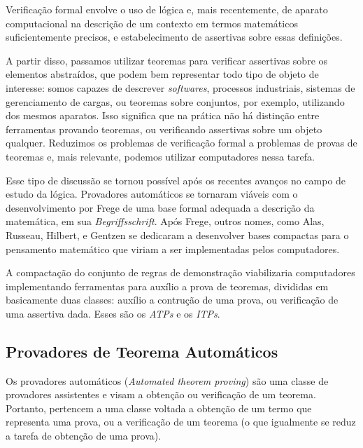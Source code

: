 Verificação formal envolve o uso de lógica e, mais recentemente, de aparato computacional na descrição de um contexto em termos matemáticos suficientemente precisos, e estabelecimento de assertivas sobre essas definições.

A partir disso, passamos utilizar teoremas para verificar assertivas sobre os elementos abstraídos, que podem bem representar todo tipo de objeto de interesse: somos capazes de descrever \textit{softwares}, processos industriais, sistemas de gerenciamento de cargas, ou teoremas sobre conjuntos, por exemplo, utilizando dos mesmos aparatos.
Isso significa que na prática não há distinção entre ferramentas provando teoremas, ou verificando assertivas sobre um objeto qualquer.
Reduzimos os problemas de verificação formal a problemas de provas de teoremas e, mais relevante, podemos utilizar computadores nessa tarefa.

Esse tipo de discussão se tornou possível após os recentes avanços no campo de estudo da lógica.
Provadores automáticos se tornaram viáveis com o desenvolvimento por Frege de uma base formal adequada a descrição da matemática, em sua \textit{Begriffsschrift}.%
Após Frege, outros nomes, como Alas, Russeau, Hilbert, e Gentzen se dedicaram a desenvolver bases compactas para o pensamento matemático que viriam a ser implementadas pelos computadores.

A compactação do conjunto de regras de demonstração viabilizaria computadores implementando ferramentas para auxílio a prova de teoremas, divididas em basicamente duas classes: auxílio a contrução de uma prova, ou verificação de uma assertiva dada. Esses são os \textit{ATPs} e os \textit{ITPs}.

\subsection{Provadores de Teorema Automáticos}

Os provadores automáticos (\textit{Automated theorem proving}) são uma classe de provadores assistentes e visam a obtenção ou verificação de um teorema.
Portanto, pertencem a uma classe voltada a obtenção de um termo que representa uma prova, ou a verificação de um teorema (o que igualmente se reduz a tarefa de obtenção de uma prova).


